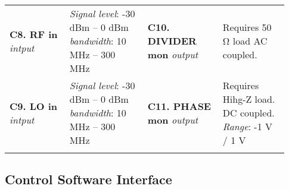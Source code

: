 \begin{table}[ht]
    \centering
    \begin{tabular}{p{0.2\linewidth} p{0.26\linewidth} p{0.25\linewidth}  p{0.22\linewidth}}
    \hline
    \hline
    \addlinespace
        \textbf{C8. RF in}
        \newline \textit{intput}
    &   
        {\footnotesize \textit{Signal level}: 
        \newline \hspace*{\fill} -30 dBm – 0 dBm 
        \newline \textit{bandwidth}:
        \newline \hspace*{\fill} 10 MHz – 300 MHz }
    &
        \textbf{C10. DIVIDER mon}
        \newline \textit{output}
    &
        {\footnotesize Requires 50 \si{\ohm} load
        \newline AC coupled.}
    \\
    
    \addlinespace
    
         \textbf{C9. LO in}  
        \newline \textit{intput}
    &   
        {\footnotesize \textit{Signal level}:
        \newline \hspace*{\fill} -30 dBm – 0 dBm 
        \newline \textit{bandwidth}:
        \newline \hspace*{\fill} 10 MHz – 300 MHz }
    &
        \textbf{C11. PHASE mon}
        \newline \textit{output}
    &
        {\footnotesize Requires Hihg-Z load.
        \newline DC coupled.
        \newline \textit{Range}: \hspace*{\fill} -1 V / 1 V }
    \\
    \addlinespace
    \hline
    \hline
    
    \end{tabular}
\end{table}





\subsection{Control Software Interface} \label{PLL_SW_chapter}


